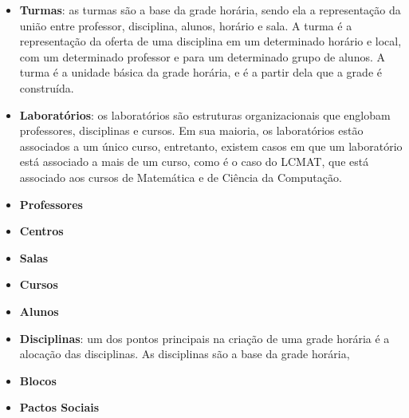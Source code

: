 \begin{itemize}
  \item \textbf{Turmas}: as turmas são a base da grade horária, sendo ela a representação da união entre professor, disciplina, alunos, horário e sala. A turma é a representação da oferta de uma disciplina em um determinado horário e local, com um determinado professor e para um determinado grupo de alunos. A turma é a unidade básica da grade horária, e é a partir dela que a grade é construída.
  \item \textbf{Laboratórios}: os laboratórios são estruturas organizacionais que englobam professores, disciplinas e cursos. Em sua maioria, os laboratórios estão associados a um único curso, entretanto, existem casos em que um laboratório está associado a mais de um curso, como é o caso do LCMAT, que está associado aos cursos de Matemática e de Ciência da Computação.
  \item \textbf{Professores}
  \item \textbf{Centros}
  \item \textbf{Salas}
  \item \textbf{Cursos}
  \item \textbf{Alunos}
  \item \textbf{Disciplinas}: um dos pontos principais na criação de uma grade horária é a alocação das disciplinas. As disciplinas são a base da grade horária,
  \item \textbf{Blocos}
  \item \textbf{Pactos Sociais}
\end{itemize}
